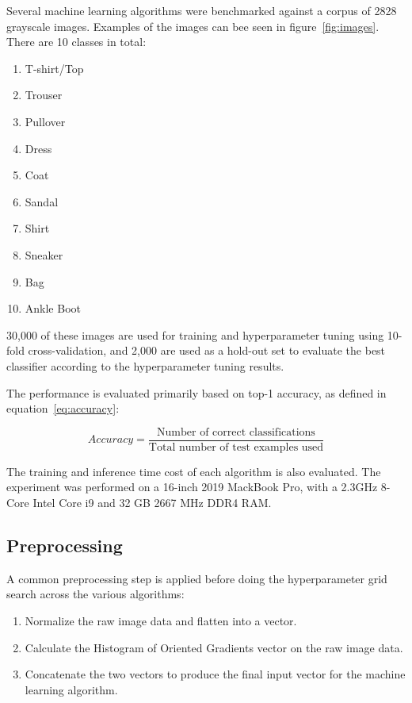 \documentclass[landscape,twocolumn]{article}
\begin{document}
Several machine learning algorithms were benchmarked against a corpus of 28\times{}28 grayscale images. Examples of the images can bee seen in figure~\ref{fig:images}. There are 10 classes in total:
\begin{enumerate}
\item T-shirt/Top
\item Trouser
\item Pullover
\item Dress
\item Coat
\item Sandal
\item Shirt
\item Sneaker
\item Bag
\item Ankle Boot
\end{enumerate}

30,000 of these images are used for training and hyperparameter tuning using 10-fold cross-validation, and 2,000 are used as a hold-out set to evaluate the best classifier according to the hyperparameter tuning results.

The performance is evaluated primarily based on top-1 accuracy, as defined in equation~\ref{eq:accuracy}:

\begin{equation}
\label{eq:accuracy}
Accuracy = \frac{\text{Number of correct classifications}}{\text{Total number of test examples used}}
\end{equation}

The training and inference time cost of each algorithm is also evaluated. The experiment was performed on a 16-inch 2019 MackBook Pro, with a 2.3GHz 8-Core Intel Core i9 and 32 GB 2667 MHz DDR4 RAM\@.

\subsection{Preprocessing}
A common preprocessing step is applied before doing the hyperparameter grid search across the various algorithms:
\begin{enumerate}
\item Normalize the raw image data and flatten into a vector.
\item Calculate the Histogram of Oriented Gradients vector on the raw image data.
\item Concatenate the two vectors to produce the final input vector for the machine learning algorithm.
\end{enumerate}
\end{document}
